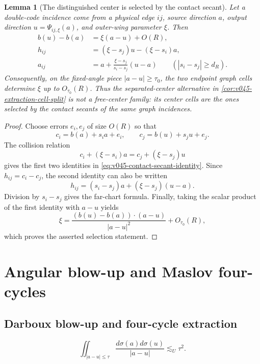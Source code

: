 \documentclass[10pt]{article}
\newtheorem{lemma}[theorem]{Lemma}
\begin{document}
\begin{lemma}[The distinguished center is selected by the contact secant]
\label{lem:v045-contact-secant-identity}
Let a double-code incidence come from a physical edge \(ij\), source direction \(a\), output
direction \(u=\Psi_{ij,\xi}(a)\), and outer-wing parameter \(\xi\).  Then
\begin{equation}
\label{eq:v045-contact-secant-identity}
\boxed{
\begin{aligned}
b(u)-b(a)
&=
\xi(a-u)+O(R),\\
h_{ij}
&=
(\xi-s_j)u-(\xi-s_i)a,\\
a_{ij}
&=
a+\frac{\xi-s_j}{s_i-s_j}(u-a)
\qquad (|s_i-s_j|\ge d_R).
\end{aligned}
}
\end{equation}
Consequently, on the fixed-angle piece \(|a-u|\ge\tau_0\), the two endpoint graph cells
determine \(\xi\) up to \(O_{\tau_0}(R)\).  Thus the separated-center alternative in
\cref{cor:v045-extraction-cell-split} is not a free-center family: its center cells are the ones
selected by the contact secants of the same graph incidences.
\end{lemma}

\begin{proof}
Choose errors \(e_i,e_j\) of size \(O(R)\) so that
\[
c_i=b(a)+s_i a+e_i,
\qquad
c_j=b(u)+s_j u+e_j.
\]
The collision relation
\[
c_i+(\xi-s_i)a
=
c_j+(\xi-s_j)u
\]
gives the first two identities in \eqref{eq:v045-contact-secant-identity}.  Since
\(h_{ij}=c_i-c_j\), the second identity can also be written
\[
h_{ij}
=
(s_i-s_j)a+(\xi-s_j)(u-a).
\]
Division by \(s_i-s_j\) gives the far-chart formula.  Finally, taking the scalar product of
the first identity with \(a-u\) yields
\[
\xi
=
\frac{(b(u)-b(a))\mathbin{\cdot}(a-u)}{|a-u|^2}
+O_{\tau_0}(R),
\]
which proves the asserted selection statement.
\end{proof}

\clearpage
\section{Angular blow-up and Maslov four-cycles}

\subsection{Darboux blow-up and four-cycle extraction}

\begin{equation}
\label{eq:v046-newton-near-diagonal}
\boxed{
\iint_{|a-u|\le\tau}
\frac{d\sigma(a)d\sigma(u)}{|a-u|}
\lesssim_U \tau^2.
}
\end{equation}
\end{document}

